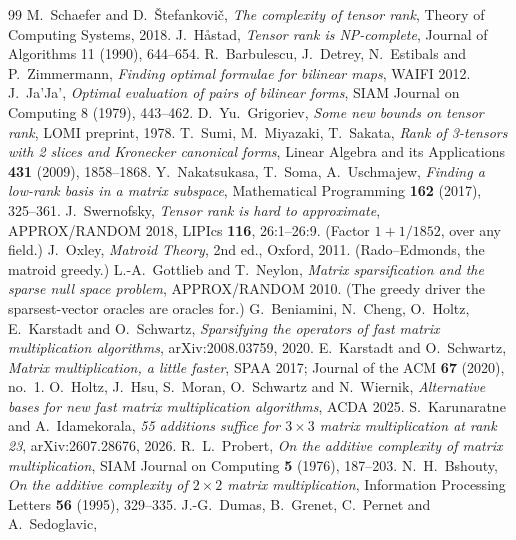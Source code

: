 \documentclass[11pt,reqno]{amsart}
\theoremstyle{plain}
\theoremstyle{definition}
\theoremstyle{remark}
\begin{document}
\begin{thebibliography}{99}
 M.~Schaefer and D.~\v{S}tefankovi\v{c},
  \emph{The complexity of tensor rank}, Theory of Computing Systems, 2018.
 J.~H\r{a}stad, \emph{Tensor rank is NP-complete},
  Journal of Algorithms 11 (1990), 644--654.
 R.~Barbulescu, J.~Detrey, N.~Estibals and P.~Zimmermann,
  \emph{Finding optimal formulae for bilinear maps}, WAIFI 2012.
 J.~Ja'Ja', \emph{Optimal evaluation of pairs of bilinear
  forms}, SIAM Journal on Computing 8 (1979), 443--462.
 D.~Yu.~Grigoriev, \emph{Some new bounds on tensor rank},
  LOMI preprint, 1978.
 T.~Sumi, M.~Miyazaki, T.~Sakata, \emph{Rank of 3-tensors
  with 2 slices and Kronecker canonical forms}, Linear Algebra and its
  Applications \textbf{431} (2009), 1858--1868.
 Y.~Nakatsukasa, T.~Soma, A.~Uschmajew,
  \emph{Finding a low-rank basis in a matrix subspace}, Mathematical
  Programming \textbf{162} (2017), 325--361.
 J.~Swernofsky, \emph{Tensor rank is hard to
  approximate}, APPROX/RANDOM 2018, LIPIcs \textbf{116}, 26:1--26:9.
  (Factor $1 + 1/1852$, over any field.)
 J.~Oxley, \emph{Matroid Theory}, 2nd ed., Oxford, 2011.
  (Rado--Edmonds, the matroid greedy.)
 L.-A.~Gottlieb and T.~Neylon, \emph{Matrix sparsification
  and the sparse null space problem}, APPROX/RANDOM 2010.
  (The greedy driver the sparsest-vector oracles are oracles for.)
 G.~Beniamini, N.~Cheng, O.~Holtz, E.~Karstadt and
  O.~Schwartz, \emph{Sparsifying the operators of fast matrix multiplication
  algorithms}, arXiv:2008.03759, 2020.
 E.~Karstadt and O.~Schwartz, \emph{Matrix multiplication,
  a little faster}, SPAA 2017; Journal of the ACM \textbf{67} (2020), no.~1.
 O.~Holtz, J.~Hsu, S.~Moran, O.~Schwartz and N.~Wiernik,
  \emph{Alternative bases for new fast matrix multiplication algorithms},
  ACDA 2025.
 S.~Karunaratne and A.~Idamekorala, \emph{55 additions
  suffice for $3\times 3$ matrix multiplication at rank 23},
  arXiv:2607.28676, 2026.
 R.~L.~Probert, \emph{On the additive complexity of matrix
  multiplication}, SIAM Journal on Computing \textbf{5} (1976), 187--203.
 N.~H.~Bshouty, \emph{On the additive complexity of
  $2\times 2$ matrix multiplication}, Information Processing Letters
  \textbf{56} (1995), 329--335.
 J.-G.~Dumas, B.~Grenet, C.~Pernet and A.~Sedoglavic,

\end{thebibliography}
\end{document}
